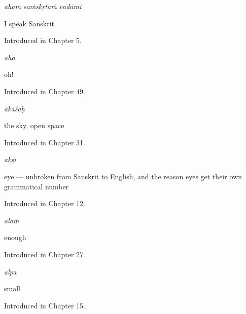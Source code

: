\noindent\begin{minipage}[t]{\linewidth}
\raggedright
\textbf{  }\enspace\emph{ahaṁ saṁskṛtaṁ vadāmi}\par
\small I speak Sanskrit\par
\footnotesize Introduced in Chapter 5.
\end{minipage}\par\medskip

\noindent\begin{minipage}[t]{\linewidth}
\raggedright
\textbf{}\enspace\emph{aho}\par
\small oh!\par
\footnotesize Introduced in Chapter 49.
\end{minipage}\par\medskip

\noindent\begin{minipage}[t]{\linewidth}
\raggedright
\textbf{}\enspace\emph{ākāśaḥ}\par
\small the sky, open space\par
\footnotesize Introduced in Chapter 31.
\end{minipage}\par\medskip

\noindent\begin{minipage}[t]{\linewidth}
\raggedright
\textbf{}\enspace\emph{akṣi}\par
\small eye — unbroken from Sanskrit to English, and the reason eyes get their own grammatical number\par
\footnotesize Introduced in Chapter 12.
\end{minipage}\par\medskip

\noindent\begin{minipage}[t]{\linewidth}
\raggedright
\textbf{}\enspace\emph{alam}\par
\small enough\par
\footnotesize Introduced in Chapter 27.
\end{minipage}\par\medskip

\noindent\begin{minipage}[t]{\linewidth}
\raggedright
\textbf{}\enspace\emph{alpa}\par
\small small\par
\footnotesize Introduced in Chapter 15.
\end{minipage}\par\medskip

